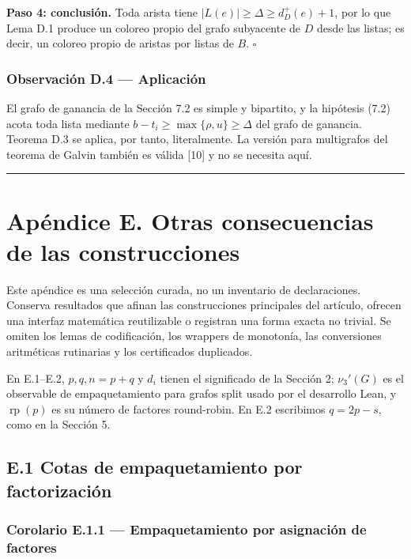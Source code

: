 \documentclass[spanish,11pt,a4paper]{article}
\begin{document}
\textbf{Paso 4: conclusión.} Toda arista tiene
\(|L(e)|\ge\Delta\ge d^+_D(e)+1\), por lo que Lema D.1 produce un
coloreo propio del grafo subyacente de \(D\) desde las listas; es decir,
un coloreo propio de aristas por listas de \(B\). \(\square\)

\subsubsection{Observación D.4 ---
Aplicación}\label{observaciuxf3n-d.4-aplicaciuxf3n}

El grafo de ganancia de la Sección 7.2 es simple y bipartito, y la
hipótesis (7.2) acota toda lista mediante
\(b-t_i\ge\max\{\rho,u\}\ge\Delta\) del grafo de ganancia. Teorema D.3
se aplica, por tanto, literalmente. La versión para multigrafos del
teorema de Galvin también es válida {[}10{]} y no se necesita aquí.

\begin{center}\rule{0.5\linewidth}{0.5pt}\end{center}

\section{Apéndice E. Otras consecuencias de las
construcciones}\label{apuxe9ndice-e.-otras-consecuencias-de-las-construcciones}

Este apéndice es una selección curada, no un inventario de
declaraciones. Conserva resultados que afinan las construcciones
principales del artículo, ofrecen una interfaz matemática reutilizable o
registran una forma exacta no trivial. Se omiten los lemas de
codificación, los wrappers de monotonía, las conversiones aritméticas
rutinarias y los certificados duplicados.

En E.1--E.2, \(p,q,n=p+q\) y \(d_i\) tienen el significado de la Sección
2; \(\nu_3'(G)\) es el observable de empaquetamiento para grafos split
usado por el desarrollo Lean, y \(\operatorname{rp}(p)\) es su número de
factores round-robin. En E.2 escribimos \(q=2p-s\), como en la Sección
5.

\subsection{E.1 Cotas de empaquetamiento por
factorización}\label{e.1-cotas-de-empaquetamiento-por-factorizaciuxf3n}

\subsubsection{Corolario E.1.1 --- Empaquetamiento por asignación de
factores}\label{corolario-e.1.1-empaquetamiento-por-asignaciuxf3n-de-factores}
\end{document}
